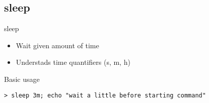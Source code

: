 \subsection{sleep}

\begin{frame}[fragile]{sleep}
  \begin{itemize}
    \pause \item Wait given amount of time
    \pause \item Understads time quantifiers (s, m, h)
  \end{itemize}
  \pause

  \begin{exampleblock}{Basic usage}
    \begin{lstlisting}[showstringspaces=false,basicstyle=\tiny]
> sleep 3m; echo "wait a little before starting command"
    \end{lstlisting}
  \end{exampleblock}
\end{frame}


